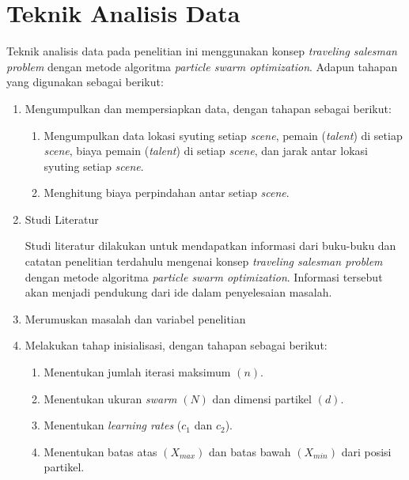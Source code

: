 \section{Teknik Analisis Data}
\vspace{-4mm}
{\frenchspacing
    Teknik analisis data pada penelitian ini menggunakan konsep \textit{traveling salesman problem} dengan metode algoritma \textit{particle swarm optimization}.
    Adapun tahapan yang digunakan sebagai berikut:

    \begin{enumerate}[align=left, left=0mm, nolistsep]
        \item Mengumpulkan dan mempersiapkan data, dengan tahapan sebagai berikut: \par \nobreak
              \begin{enumerate}[label=(\alph*), align=left, left=0mm, nolistsep]
                  \item Mengumpulkan data lokasi syuting setiap \textit{scene}, pemain (\textit{talent}) di setiap \textit{scene}, biaya pemain (\textit{talent}) di setiap \textit{scene}, dan jarak antar lokasi syuting setiap \textit{scene}.
                  \item Menghitung biaya perpindahan antar setiap \textit{scene}.
              \end{enumerate}
        \item Studi Literatur \par \nobreak
              Studi literatur dilakukan untuk mendapatkan informasi dari buku-buku dan catatan penelitian terdahulu mengenai konsep \textit{traveling salesman problem} dengan metode algoritma \textit{particle swarm optimization}.
              Informasi tersebut akan menjadi pendukung dari ide dalam penyelesaian masalah.
        \item Merumuskan masalah dan variabel penelitian
        \item Melakukan tahap inisialisasi, dengan tahapan sebagai berikut: \par \nobreak
              \begin{enumerate}[label=(\alph*), align=left, left=0mm, nolistsep]
                  \item Menentukan jumlah iterasi maksimum $(n)$.
                  \item Menentukan ukuran \textit{swarm} $(N)$ dan dimensi partikel $(d)$.
                  \item Menentukan \textit{learning rates} ($c_{1}$ dan $c_{2}$).
                  \item Menentukan batas atas $(X_{max})$ dan batas bawah $(X_{min})$ dari posisi partikel.

\end{enumerate}
\end{enumerate}}
